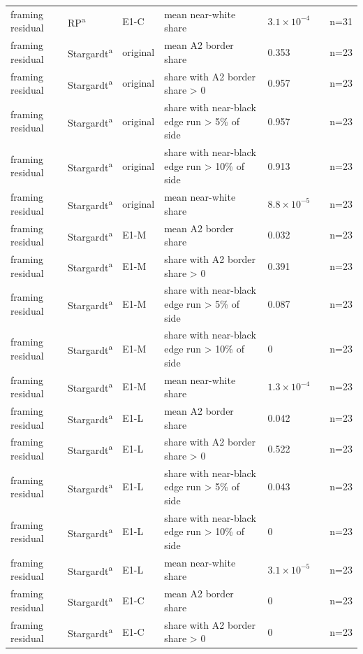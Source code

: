 \begin{longtable}{@{}p{3.3cm}lp{1.5cm}p{3.6cm}p{2.2cm}p{1.6cm}p{3.2cm}@{}}
framing residual & RP\textsuperscript{a} & E1-C & mean near-white share & $3.1\times10^{-4}$ &  & n=31 \\
framing residual & Stargardt\textsuperscript{a} & original & mean A2 border share & 0.353 &  & n=23 \\
framing residual & Stargardt\textsuperscript{a} & original & share with A2 border share > 0 & 0.957 &  & n=23 \\
framing residual & Stargardt\textsuperscript{a} & original & share with near-black edge run > 5\% of side & 0.957 &  & n=23 \\
framing residual & Stargardt\textsuperscript{a} & original & share with near-black edge run > 10\% of side & 0.913 &  & n=23 \\
framing residual & Stargardt\textsuperscript{a} & original & mean near-white share & $8.8\times10^{-5}$ &  & n=23 \\
framing residual & Stargardt\textsuperscript{a} & E1-M & mean A2 border share & 0.032 &  & n=23 \\
framing residual & Stargardt\textsuperscript{a} & E1-M & share with A2 border share > 0 & 0.391 &  & n=23 \\
framing residual & Stargardt\textsuperscript{a} & E1-M & share with near-black edge run > 5\% of side & 0.087 &  & n=23 \\
framing residual & Stargardt\textsuperscript{a} & E1-M & share with near-black edge run > 10\% of side & 0 &  & n=23 \\
framing residual & Stargardt\textsuperscript{a} & E1-M & mean near-white share & $1.3\times10^{-4}$ &  & n=23 \\
framing residual & Stargardt\textsuperscript{a} & E1-L & mean A2 border share & 0.042 &  & n=23 \\
framing residual & Stargardt\textsuperscript{a} & E1-L & share with A2 border share > 0 & 0.522 &  & n=23 \\
framing residual & Stargardt\textsuperscript{a} & E1-L & share with near-black edge run > 5\% of side & 0.043 &  & n=23 \\
framing residual & Stargardt\textsuperscript{a} & E1-L & share with near-black edge run > 10\% of side & 0 &  & n=23 \\
framing residual & Stargardt\textsuperscript{a} & E1-L & mean near-white share & $3.1\times10^{-5}$ &  & n=23 \\
framing residual & Stargardt\textsuperscript{a} & E1-C & mean A2 border share & 0 &  & n=23 \\
framing residual & Stargardt\textsuperscript{a} & E1-C & share with A2 border share > 0 & 0 &  & n=23 \\

\end{longtable}
